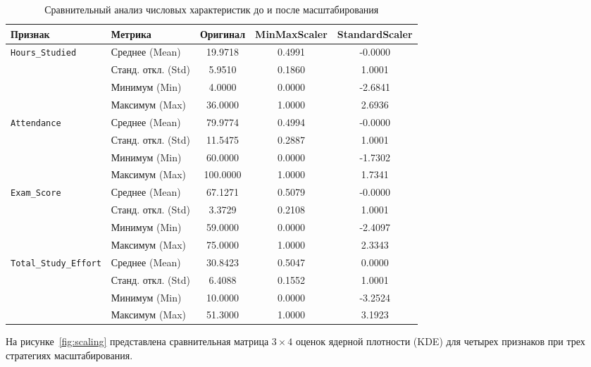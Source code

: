 \documentclass[14pt,a4paper]{extarticle}
\begin{document}
\begin{table}[H]
    \centering
    \caption{Сравнительный анализ числовых характеристик до и после масштабирования}
    \label{tab:scaling_stats}
    \fontsize{8.5pt}{10.5pt}\selectfont
    \begin{tabularx}{\textwidth}{|>{\raggedright\arraybackslash}p{3.5cm}|>{\raggedright\arraybackslash}p{3.2cm}|c|c|c|}
        \hline
        \textbf{Признак} & \textbf{Метрика} & \textbf{Оригинал} & \textbf{MinMaxScaler} & \textbf{StandardScaler} \\
        \hline
        \texttt{Hours\_Studied} & Среднее (Mean) & 19.9718 & 0.4991 & -0.0000 \\
        & Станд. откл. (Std) & 5.9510 & 0.1860 & 1.0001 \\
        & Минимум (Min) & 4.0000 & 0.0000 & -2.6841 \\
        & Максимум (Max) & 36.0000 & 1.0000 & 2.6936 \\
        \hline
        \texttt{Attendance} & Среднее (Mean) & 79.9774 & 0.4994 & -0.0000 \\
        & Станд. откл. (Std) & 11.5475 & 0.2887 & 1.0001 \\
        & Минимум (Min) & 60.0000 & 0.0000 & -1.7302 \\
        & Максимум (Max) & 100.0000 & 1.0000 & 1.7341 \\
        \hline
        \texttt{Exam\_Score} & Среднее (Mean) & 67.1271 & 0.5079 & -0.0000 \\
        & Станд. откл. (Std) & 3.3729 & 0.2108 & 1.0001 \\
        & Минимум (Min) & 59.0000 & 0.0000 & -2.4097 \\
        & Максимум (Max) & 75.0000 & 1.0000 & 2.3343 \\
        \hline
        \texttt{Total\_Study\_Effort} & Среднее (Mean) & 30.8423 & 0.5047 & 0.0000 \\
        & Станд. откл. (Std) & 6.4088 & 0.1552 & 1.0001 \\
        & Минимум (Min) & 10.0000 & 0.0000 & -3.2524 \\
        & Максимум (Max) & 51.3000 & 1.0000 & 3.1923 \\
        \hline
    \end{tabularx}
\end{table}

На рисунке~\ref{fig:scaling} представлена сравнительная матрица $3 \times 4$ оценок ядерной плотности (KDE) для четырех признаков при трех стратегиях масштабирования.
\end{document}
